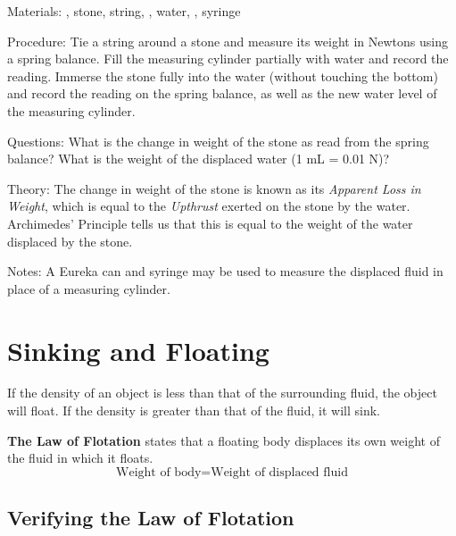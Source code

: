 \begin{multicols}{2}
\begin{description*}
\item[Materials:]{, stone, string, , water, , syringe}
\item[Procedure:]{Tie a string around a stone and measure its weight in Newtons using a spring balance. Fill the measuring cylinder partially with water and record the reading. Immerse the stone fully into the water (without touching the bottom) and record the reading on the spring balance, as well as the new water level of the measuring cylinder.}
\item[Questions:]{What is the change in weight of the stone as read from the spring balance? What is the weight of the displaced water (1 mL = 0.01 N)?}
\item[Theory:]{The change in weight of the stone is known as its \emph{Apparent Loss in Weight}, which is equal to the \emph{Upthrust} exerted on the stone by the water. Archimedes' Principle tells us that this is equal to the weight of the water displaced by the stone.}
\item[Notes:]{A Eureka can and syringe may be used to measure the displaced fluid in place of a measuring cylinder.}
\end{description*}


\section*{Sinking and Floating} 
If the density of an object is less than that of the surrounding fluid, the object will float. If the density is greater than that of the fluid, it will sink.

\textbf{The Law of Flotation} states that a floating body displaces its own weight of the fluid in which it floats.
$$\text{Weight of body} = \text{Weight of displaced fluid}$$


\subsection{Verifying the Law of Flotation}


\end{multicols}
